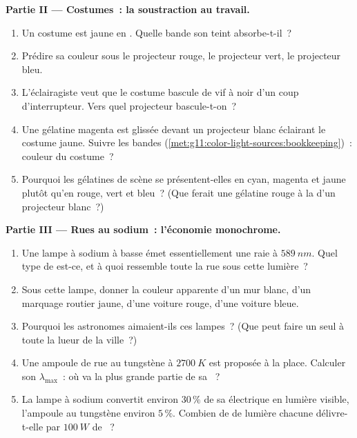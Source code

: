 \begin{problem}
\medskip
\noindent\textbf{Partie II --- Costumes~: la soustraction au travail.}
\begin{enumerate}[resume]
  \item Un costume est jaune en .
        Quelle bande son teint absorbe-t-il~?
  \item Prédire sa couleur sous le projecteur rouge, le projecteur
        vert, le projecteur bleu.
  \item L'éclairagiste veut que le costume bascule de vif à noir d'un
        coup d'interrupteur. Vers quel projecteur bascule-t-on~?
  \item Une gélatine magenta est glissée devant un projecteur blanc
        éclairant le costume jaune. Suivre les bandes
        (\cref{met:g11:color-light-sources:bookkeeping})~: couleur du
        costume~?
  \item Pourquoi les gélatines de scène se présentent-elles en cyan,
        magenta et jaune plutôt qu'en rouge, vert et bleu~? (Que
        ferait une gélatine rouge à la
         d'un projecteur blanc~?)
\end{enumerate}

\medskip
\noindent\textbf{Partie III --- Rues au sodium~: l'économie monochrome.}
\begin{enumerate}[resume]
  \item Une lampe à sodium à basse  émet
        essentiellement une raie à $\qty{589}{nm}$. Quel type de
         est-ce, et à quoi ressemble toute la
        rue sous cette lumière~?
  \item Sous cette lampe, donner la couleur apparente d'un mur blanc,
        d'un marquage routier jaune, d'une voiture rouge, d'une voiture
        bleue.
  \item Pourquoi les astronomes aimaient-ils ces lampes~? (Que peut
        faire un seul  à toute la
        lueur de la ville~?)
  \item Une ampoule de rue au tungstène à $\qty{2700}{K}$ est proposée
        à la place. Calculer son $\lambda_{\max}$~: où va la plus grande
        partie de sa ~?
  \item La lampe à sodium convertit environ $30\,\%$ de sa
         électrique en lumière visible,
        l'ampoule au tungstène environ $5\,\%$. Combien de
         de lumière chacune délivre-t-elle
        par $\qty{100}{W}$ de ~?
\end{enumerate}


\end{problem}

